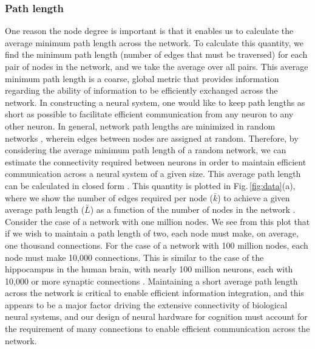 \documentclass[twocolumn]{article}
\begin{document}
\subsubsection{Path length}
One reason the node degree is important is that it enables us to calculate the average minimum path length across the network. To calculate this quantity, we find the minimum path length (number of edges that must be traversed) for each pair of nodes in the network, and we take the average over all pairs. This average minimum path length is a coarse, global metric that provides information regarding the ability of information to be efficiently exchanged across the network. In constructing a neural system, one would like to keep path lengths as short as possible to facilitate efficient communication from any neuron to any other neuron. In general, network path lengths are minimized in random networks \cite{baal1999}, wherein edges between nodes are assigned at random. Therefore, by considering the average minimum path length of a random network, we can estimate the connectivity required between neurons in order to maintain efficient communication across a neural system of a given size. This average path length can be calculated in closed form \cite{frfr2004}. This quantity is plotted in Fig.\,\ref{fig:data}(a), where we show the number of edges required per node ($\bar{k}$) to achieve a given average path length ($\bar{L}$) as a function of the number of nodes in the network \cite{frfr2004}. Consider the case of a network with one million nodes. We see from this plot that if we wish to maintain a path length of two, each node must make, on average, one thousand connections. For the case of a network with 100 million nodes, each node must make 10,000 connections. This is similar to the case of the hippocampus in the human brain, with nearly 100 million neurons, each with 10,000 or more synaptic connections \cite{bu2006}. Maintaining a short average path length across the network is critical to enable efficient information integration, and this appears to be a major factor driving the extensive connectivity of biological neural systems, and our design of neural hardware for cognition must account for the requirement of many connections to enable efficient communication across the network.  
\end{document}
